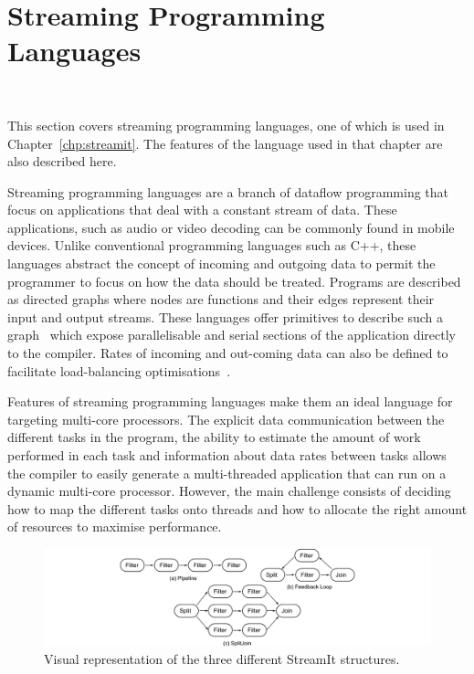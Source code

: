 \section{Streaming Programming Languages}~\label{sec:bg:stream}

This section covers streaming programming languages, one of which is used in Chapter~\ref{chp:streamit}.
The features of the language used in that chapter are also described here.

Streaming programming languages are a branch of dataflow programming that focus on applications that deal with a constant stream of data.
These applications, such as audio or video decoding can be commonly found in mobile devices.
Unlike conventional programming languages such as C++, these languages abstract the concept of incoming and outgoing data to permit the programmer to focus on how the data should be treated.
Programs are described as directed graphs where nodes are functions and their edges represent their input and output streams. 
These languages offer primitives to describe such a graph~\cite{theis2002streamit} which expose parallelisable and serial sections of the application directly to the compiler. 
Rates of incoming and out-coming data can also be defined to facilitate load-balancing optimisations~\cite{chen2005rawstream}.

Features of streaming programming languages make them an ideal language for targeting multi-core processors.
The explicit data communication between the different tasks in the program, the ability to estimate the amount of work performed in each task and information about data rates between tasks allows the compiler to easily generate a multi-threaded application that can run on a dynamic multi-core processor.
However, the main challenge consists of deciding how to map the different tasks onto threads and how to allocate the right amount of resources to maximise performance.


\begin{figure}[t]
    \centering
    \includegraphics[width=1\textwidth]{streamit-paper/graphics/streamit_types.pdf}
    \caption{Visual representation of the three different StreamIt structures.}
    \label{fig:streamittypes}
		\vspace{-1em}

\end{figure}

